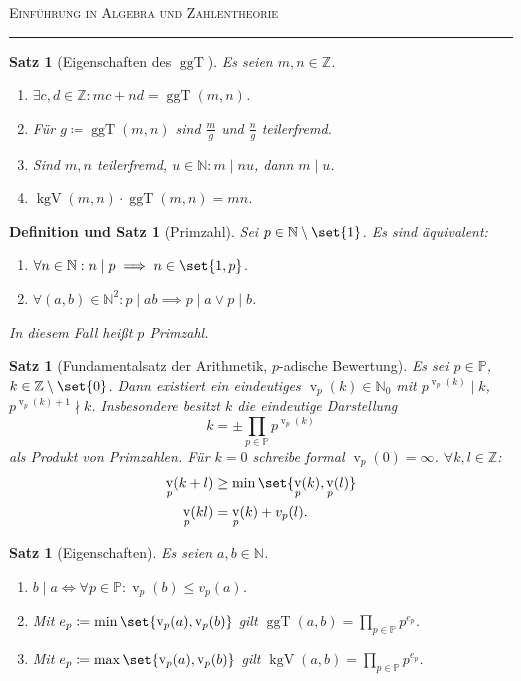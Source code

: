 \documentclass[a4paper]{article}
\newcounter{Sec}
\theoremstyle{marginbreak}
\newtheorem{satz}[definition]{Satz}
\newtheorem{defsatz}[definition]{Definition und Satz}
\newcommand{\sep}{%
	\rule{\textwidth}{0.3pt}%
	\stepcounter{Sec}%
	}
\newcommand\divides\mid
\newcommand\ndivides\nmid
\newcommand{\Z}{\mathbb{Z}}
\newcommand{\N}{\mathbb{N}}
\renewcommand{\P}{\mathbb{P}}
\DeclareMathOperator{\ggT}{ggT}
\DeclareMathOperator{\kgV}{kgV}
\DeclareMathOperator{\v}{v}
\begin{document}
\textsc{Einführung in Algebra und Zahlentheorie}

\sep
\begin{satz}[Eigenschaften des $\ggT$]
	Es seien $m, n\in\Z$.
	\begin{enumerate}[label=(\alph*)]
		\item $\exists c, d\in\Z:mc+nd=\ggT(m, n)$.
		\item Für $g\coloneqq \ggT(m, n)$ sind $\frac{m}{g}$ und $\frac{n}{g}$ teilerfremd.
		\item Sind $m, n$ teilerfremd, $u\in\N: m\divides nu$, dann $m\divides u$.
		\item $\kgV(m, n)\cdot\ggT(m, n)=mn$.
	\end{enumerate}
\end{satz}
\begin{defsatz}[Primzahl]
	Sei $p\in\N\setminus\set{1}$. Es sind äquivalent:
	\begin{enumerate}[label=(\alph*)]
		\item $\forall n\in\N: n\divides p\implies n\in\set{1, p}$.
		\item $\forall (a, b)\in\N^2: p\divides ab\implies p\divides a\vee p\divides b$.
	\end{enumerate}
	In diesem Fall heißt $p$ Primzahl.
\end{defsatz}
\begin{satz}[Fundamentalsatz der Arithmetik, $p$-adische Bewertung]
	Es sei $p\in\P$, $k\in\Z\setminus\set{0}$. Dann existiert ein eindeutiges
	$\v_p(k)\in\N_0$ mit $p^{\v_p(k)}\divides k$, $p^{\v_p(k)+1}\ndivides k$.
	Insbesondere besitzt $k$ die eindeutige Darstellung
	\[
		k=\pm\prod_{p\in\P}p^{\v_p(k)}
	\]
	als Produkt von Primzahlen. Für $k=0$ schreibe formal $\v_p(0)=\infty$.
	$\forall k,l\in\Z$:
	\begin{align*}
		\v_p(k+l)&\geq\min\set{\v_p(k), \v_p(l)}\\
		\v_p(kl)&=\v_p(k)+v_p(l).
	\end{align*}
\end{satz}
\begin{satz}[Eigenschaften]
	Es seien $a, b\in\N$.
	\begin{enumerate}[label=(\alph*)]
		\item $b\divides a\iff\forall p\in\P:\v_p(b)\leq v_p(a)$.
		\item Mit $e_p\coloneqq\min\set{\v_p(a), \v_p(b)}$ gilt $\ggT(a, b)=\prod_{p\in\P}p^{e_p}$.
		\item Mit $e_p\coloneqq\max\set{\v_p(a), \v_p(b)}$ gilt $\kgV(a, b)=\prod_{p\in\P}p^{e_p}$.
	\end{enumerate}
\end{satz}
\end{document}

